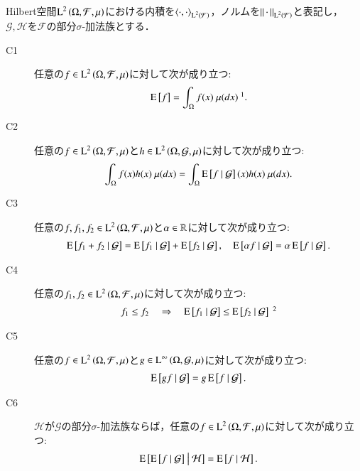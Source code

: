 	\begin{screen}
	\begin{prp}[条件付き期待値の性質]
		Hilbert空間$\operatorname{L}^{2} \left(\Omega, \mathcal{F},\mu\right)$における内積を$\inprod<\cdot,\cdot>_{\Lp{2}{\mathcal{F}}}$，ノルムを$\left\|\, \cdot\, \right\|_{\operatorname{L}^{2} \left(\mathcal{F}\right)}$と表記し，
		$\mathcal{G},\mathcal{H}$を$\mathcal{F}$の部分$\sigma$-加法族とする．
		\begin{description}
			\item[C1] 任意の$f \in \operatorname{L}^{2} \left(\Omega, \mathcal{F},\mu\right)$に対して次が成り立つ:
				\begin{align}
					\Exp{f} = \int_{\Omega} f(x)\ \mu(dx)\ \footnotemark.
				\end{align}
				
			\item[C2]	任意の$f \in \operatorname{L}^{2} \left(\Omega, \mathcal{F},\mu\right)$と$h \in \operatorname{L}^{2} \left(\Omega, \mathcal{G},\mu\right)$に対して次が成り立つ:
				\begin{align}
					\int_{\Omega} f(x)h(x)\ \mu(dx) = \int_{\Omega} \operatorname{E} \left[ f \ \middle|\ \mathcal{G} \right](x)h(x)\ \mu(dx).
				\end{align}
				
			\item[C3]	任意の$f,f_1,f_2 \in \operatorname{L}^{2} \left(\Omega, \mathcal{F},\mu\right)$と$\alpha \in \mathbb{R}$に対して次が成り立つ:
				\begin{align}
					\operatorname{E} \left[ f_1 + f_2 \ \middle|\ \mathcal{G} \right] = \operatorname{E} \left[ f_1 \ \middle|\ \mathcal{G} \right] + \operatorname{E} \left[ f_2 \ \middle|\ \mathcal{G} \right],
					\quad \operatorname{E} \left[ \alpha f \ \middle|\ \mathcal{G} \right] = \alpha \operatorname{E} \left[ f \ \middle|\ \mathcal{G} \right].
				\end{align}

			\item[C4]	任意の$f_1,f_2 \in \operatorname{L}^{2} \left(\Omega, \mathcal{F},\mu\right)$に対して次が成り立つ:
				\begin{align}
					f_1 \leq f_2 \quad \Rightarrow \quad \cexp{f_1}{\mathcal{G}} \leq \cexp{f_2}{\mathcal{G}} \ \footnotemark
				\end{align}
			
			\item[C5]	任意の$f \in \operatorname{L}^{2} \left(\Omega, \mathcal{F},\mu\right)$と$g \in \operatorname{L}^{\infty} \left(\Omega, \mathcal{G},\mu\right)$に対して次が成り立つ:
				\begin{align}
					\operatorname{E} \left[ gf \ \middle|\ \mathcal{G} \right] = g\operatorname{E} \left[ f \ \middle|\ \mathcal{G} \right].
				\end{align}
			
			\item[C6]	$\mathcal{H}$が$\mathcal{G}$の部分$\sigma$-加法族ならば，任意の$f \in \operatorname{L}^{2} \left(\Omega, \mathcal{F},\mu\right)$に対して次が成り立つ:
				\begin{align}
					\operatorname{E} \left[ \operatorname{E} \left[ f \ \middle|\ \mathcal{G} \right] \ \middle|\ \mathcal{H} \right] = \operatorname{E} \left[ f \ \middle|\ \mathcal{H} \right].
				\end{align}
		\end{description}
		\label{prp:L2_conditional_expectation}
	\end{prp}
	\end{screen}
	
